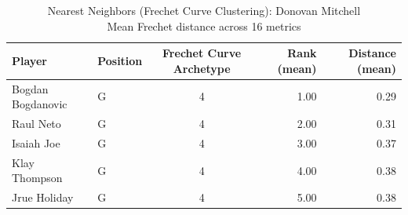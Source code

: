 \begin{table}[t]
\caption*{
{\fontsize{20}{25} Nearest Neighbors (Frechet Curve Clustering): Donovan Mitchell\fontsize{12}{15}\selectfont } \\ 
{\fontsize{14}{17}\selectfont  Mean Frechet distance across 16 metrics\fontsize{12}{15}\selectfont }
} 
\fontsize{12.0pt}{14.0pt}\selectfont
\begin{tabular*}{\linewidth}{@{\extracolsep{\fill}}llcrr}
\toprule
Player & Position & Frechet Curve Archetype & Rank (mean) & Distance (mean) \\ 
\midrule\addlinespace[2.5pt]
Bogdan Bogdanovic & G & 4 & 1.00 & 0.29 \\ 
Raul Neto & G & 4 & 2.00 & 0.31 \\ 
Isaiah Joe & G & 4 & 3.00 & 0.37 \\ 
Klay Thompson & G & 4 & 4.00 & 0.38 \\ 
Jrue Holiday & G & 4 & 5.00 & 0.38 \\ 
\bottomrule
\end{tabular*}
\end{table}

